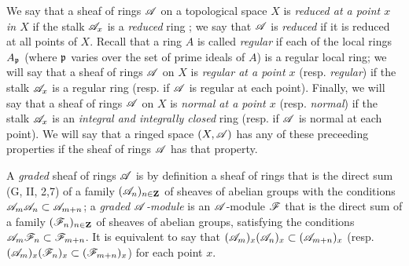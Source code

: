\begin{env}[4.1.4]
\label{0.4.1.4}
We say that a sheaf of rings $\mathscr{A}$ on a topological space $X$ is
\emph{reduced at a point $x$ in $X$} if the stalk $\mathscr{A}_x$ is a \emph{reduced}
ring ; we say that $\mathscr{A}$ is \emph{reduced} if it is reduced
at all points of $X$. Recall that a ring $A$ is called \emph{regular} if each of
the local rings $A_\mathfrak{p}$ (where $\mathfrak{p}$ varies over the set of
prime ideals of $A$) is a regular local ring; we will say that a sheaf of rings
$\mathscr{A}$ on $X$ is \emph{regular at a point $x$} (resp. \emph{regular}) if the
stalk $\mathscr{A}_x$ is a regular ring (resp. if $\mathscr{A}$ is regular at each point).
Finally, we will say that a sheaf of rings $\mathscr{A}$ on $X$ is \emph{normal at a
point $x$} (resp. \emph{normal}) if the stalk $\mathscr{A}_x$ is an \emph{integral
and integrally closed} ring (resp. if $\mathscr{A}$ is normal at each point). We will
say that a ringed space $(X,\mathscr{A})$ has any of these preceeding properties if
the sheaf of rings $\mathscr{A}$ has that property.

A \emph{graded} sheaf of rings $\mathscr{A}$ is by definition a sheaf of rings that
is the direct sum (G, II, 2,7) of a family $(\mathscr{A}_n)_{n\in\mathbf{Z}}$ of sheaves
of abelian groups with the conditions $\mathscr{A}_m\mathscr{A}_n\subset\mathscr{A}_{m+n}$; a
\emph{graded $\mathscr{A}$-module} is an $\mathscr{A}$-module $\mathscr{F}$ that is the direct
sum of a family $(\mathscr{F}_n)_{n\in\mathbf{Z}}$ of sheaves of abelian groups,
satisfying the conditions $\mathscr{A}_m\mathscr{F}_n\subset\mathscr{F}_{m+n}$. It is
equivalent to say that $(\mathscr{A}_m)_x(\mathscr{A}_n)_x\subset(\mathscr{A}_{m+n})_x$
(resp. $(\mathscr{A}_m)_x(\mathscr{F}_n)_x\subset(\mathscr{F}_{m+n})_x$) for each point $x$.
\end{env}

